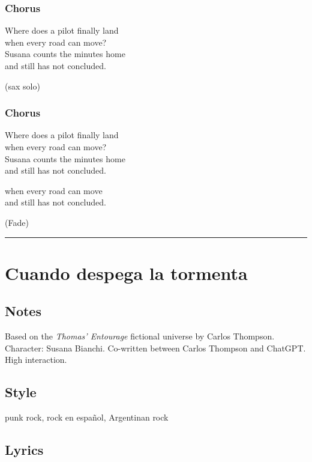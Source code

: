 \subsubsection{Chorus}\label{chorus-5}

Where does a pilot finally land\\
when every road can move?\\
Susana counts the minutes home\\
and still has not concluded.

(sax solo)

\subsubsection{Chorus}\label{chorus-6}

Where does a pilot finally land\\
when every road can move?\\
Susana counts the minutes home\\
and still has not concluded.

when every road can move\\
and still has not concluded.

(Fade)

\begin{center}\rule{0.5\linewidth}{0.5pt}\end{center}

\section{Cuando despega la tormenta}\label{cuando-despega-la-tormenta}

\subsection{Notes}\label{notes-4}

Based on the \emph{Thomas' Entourage} fictional universe by Carlos
Thompson. Character: Susana Bianchi. Co-written between Carlos Thompson
and ChatGPT. High interaction.

\subsection{Style}\label{style-4}

punk rock, rock en español, Argentinan rock

\subsection{Lyrics}\label{lyrics-4}


